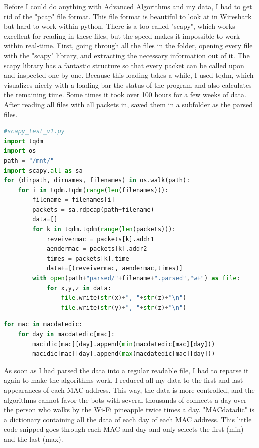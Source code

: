 \documentclass[11pt]{article}
\begin{document}
Before I could do anything with Advanced Algorithms and my data, I had to get rid of the "pcap" file format. This file format is beautiful to look at in Wireshark but hard to work within python. There is a too called "scapy", which works excellent for reading in these files, but the speed makes it impossible to work within real-time. First, going through all the files in the folder, opening every file with the "scapy" library, and extracting the necessary information out of it. The scapy library has a fantastic structure so that every packet can be called upon and inspected one by one. Because this loading takes a while, I used tqdm, which visualizes nicely with a loading bar the status of the program and also calculates the remaining time. Some times it took over 100 hours for a few weeks of data. After reading all files with all packets in, saved them in a subfolder as the parsed files.
\begin{lstlisting}[language=Python,caption="read in pcap files", style=python]
#scapy_test_v1.py
import tqdm
import os
path = "/mnt/"
import scapy.all as sa
for (dirpath, dirnames, filenames) in os.walk(path):
    for i in tqdm.tqdm(range(len(filenames))):
        filename = filenames[i]
        packets = sa.rdpcap(path+filename)
        data=[]
        for k in tqdm.tqdm(range(len(packets))):
            reveivermac = packets[k].addr1
            aendermac = packets[k].addr2
            times = packets[k].time
            data+=[(reveivermac, aendermac,times)]
        with open(path+"parsed/"+filename+".parsed","w+") as file:
            for x,y,z in data:
                file.write(str(x)+", "+str(z)+"\n")
                file.write(str(y)+", "+str(z)+"\n")
\end{lstlisting}

\begin{lstlisting}[language=Python, caption="first and last",style=python]
for mac in macdatedic:
    for day in macdatedic[mac]:
        macidic[mac][day].append(min(macdatedic[mac][day]))
        macidic[mac][day].append(max(macdatedic[mac][day]))
\end{lstlisting}

As soon as I had parsed the data into a regular readable file, I had to reparse it again to make the algorithms work. I reduced all my data to the first and last appearances of each MAC address. This way, the data is more controlled, and the algorithms cannot favor the bots with several thousands of connects a day over the person who walks by the Wi-Fi pineapple twice times a day.
"MACdatadic" is a dictionary containing all the data of each day of each MAC address. This little code snipped goes through each MAC and day and only selects the first (min) and the last (max).
\end{document}
